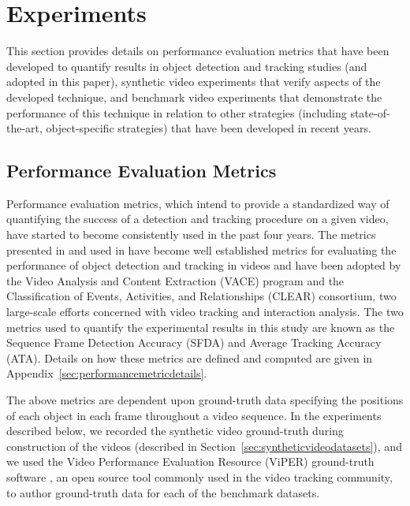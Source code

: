 \documentclass[twocolumn, final]{svjour3}
\begin{document}

\section{Experiments}
\label{sec:experiments}

This section provides details on performance evaluation metrics that have been developed to quantify results in object detection and tracking studies (and adopted in this paper), synthetic video experiments that verify aspects of the developed technique, and benchmark video experiments that demonstrate the performance of this technique in relation to other strategies (including state-of-the-art, object-specific strategies) that have been developed in recent years.   


\subsection{Performance Evaluation Metrics}
\label{sec:performanceevaluationmetrics}

Performance evaluation metrics, which intend to provide a standardized way of quantifying the success of a detection and tracking procedure on a given video, have started to become consistently used in the past four years. The metrics presented in \cite{kasturi_2008} and used in \cite{ellis_2010, taj_2007, lee_2009} have become well established metrics for evaluating the performance of object detection and tracking in videos and have been adopted by the Video Analysis and Content Extraction (VACE) program and the Classification of Events, Activities, and Relationships (CLEAR) consortium, two large-scale efforts concerned with video tracking and interaction analysis. The two metrics used to quantify the experimental results in this study are known as the Sequence Frame Detection Accuracy (SFDA) and Average Tracking Accuracy (ATA). Details on how these metrics are defined and computed are given in Appendix~\ref{sec:performancemetricdetails}.

The above metrics are dependent upon ground-truth data specifying the positions of each object in each frame throughout a video sequence. In the experiments described below, we recorded the synthetic video ground-truth during construction of the videos (described in Section~\ref{sec:syntheticvideodatasets}), and we used the Video Performance Evaluation Resource (ViPER) ground-truth software \cite{doermann_2000}, an open source tool commonly used in the video tracking community, to author ground-truth data for each of the benchmark datasets.
\end{document}
